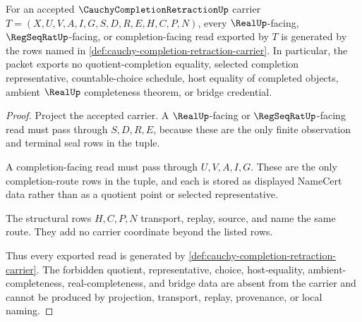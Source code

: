 \begin{theorem}
\label{thm:cauchy-completion-retraction-nonescape}
For an accepted $\CauchyCompletionRetractionUp$ carrier $T=(X,U,V,A,I,G,S,D,R,E,H,C,P,N)$, every $\RealUp$-facing, $\RegSeqRatUp$-facing, or completion-facing read exported by $T$ is generated by the rows named in \autoref{def:cauchy-completion-retraction-carrier}. In particular, the packet exports no quotient-completion equality, selected completion representative, countable-choice schedule, host equality of completed objects, ambient $\RealUp$ completeness theorem, or bridge credential.
\end{theorem}
\begin{proof}
Project the accepted carrier. A $\RealUp$-facing or $\RegSeqRatUp$-facing read must pass through $S,D,R,E$, because these are the only finite observation and terminal seal rows in the tuple.

A completion-facing read must pass through $U,V,A,I,G$. These are the only completion-route rows in the tuple, and each is stored as displayed NameCert data rather than as a quotient point or selected representative.

The structural rows $H,C,P,N$ transport, replay, source, and name the same route. They add no carrier coordinate beyond the listed rows.

Thus every exported read is generated by \autoref{def:cauchy-completion-retraction-carrier}. The forbidden quotient, representative, choice, host-equality, ambient-completeness, real-completeness, and bridge data are absent from the carrier and cannot be produced by projection, transport, replay, provenance, or local naming.
\end{proof}

\begin{closurestatus}{\CauchyCompletionRetractionUp}
  \theoryclosure{\seedClosure}
  \formalstatus{\unformalizedV}
\end{closurestatus}
